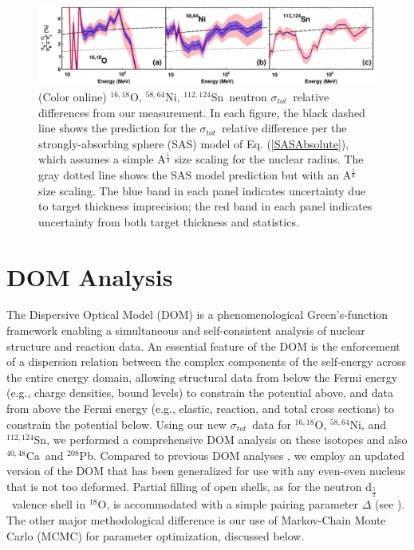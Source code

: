 \documentclass[twocolumn,secnumarabic,amssymb, nobibnotes, aps, prl,
superscriptaddress, nobalancelastpage]{revtex4}
\newcommand{\tot}{\ensuremath{\sigma_{tot}}}
\newcommand{\oEight}{\ensuremath{^{18}}O}
\newcommand{\oSixEight}{\ensuremath{^{16,18}}O}
\newcommand{\caAughtEight}{\ensuremath{^{40,48}}C\lowercase{a}}
\newcommand{\niEightFour}{\ensuremath{^{58,64}}N\lowercase{i}}
\newcommand{\snTwelveFour}{\ensuremath{^{112,124}}S\lowercase{n}}
\newcommand{\pbEight}{\ensuremath{^{208}}P\lowercase{b}}
\newcommand{\dFive}{d\ensuremath{_{\frac{5}{2}}}}
\begin{document}
\begin{figure}[tb]
    \centering
    \includegraphics[width=\textwidth]{figures/ThreePanelRelDiff.png}
    \caption[\oSixEight, \niEightFour, \snTwelveFour\ neutron \tot\ relative difference]
    {
        (Color online) \oSixEight, \niEightFour, \snTwelveFour\ neutron \tot\ relative differences
        from our measurement. In each figure, the black dashed line shows the 
        prediction for the \tot\ relative difference per the strongly-absorbing 
        sphere (SAS) model of Eq. (\ref{SASAbsolute}), which assumes a simple 
        A$^{\frac{1}{3}}$ size scaling for the nuclear radius.
        The gray dotted line shows the
        SAS model prediction but with an
        A$^{\frac{1}{6}}$ size scaling. The blue band in each panel indicates
        uncertainty due to target thickness imprecision;
        the red band in each panel
        indicates uncertainty from both target thickness and statistics.
    }
    \label{ThreePanelRelDiff}
\end{figure}

\section{DOM Analysis}
The Dispersive Optical Model (DOM) is a phenomenological Green's-function
framework enabling a simultaneous and self-consistent analysis of nuclear
structure and reaction data. An essential feature of the DOM is the enforcement of a dispersion
relation between the complex components of the self-energy across the entire
energy domain, allowing structural data from below the Fermi energy
(e.g., charge densities, bound levels) to constrain the potential above,
and data from above the Fermi energy (e.g., elastic, reaction, and total
cross sections) to constrain the potential
below. Using our new \tot\ data for \oSixEight, \niEightFour, and \snTwelveFour, we
performed a comprehensive DOM analysis on these isotopes and also
\caAughtEight\ and \pbEight. Compared to previous DOM
analyses \cite{Mueller2011, Atkinson2017, Mahzoon2014, Mahzoon2017},
we employ an updated version of the DOM that has been generalized for use with
any even-even nucleus that is not too deformed. Partial filling of open shells,
as for the neutron \dFive\ valence shell in \oEight, is accommodated with a simple
pairing parameter $\Delta$ (see \cite{PruittPhDThesis}). The other major
methodological difference is our use of Markov-Chain Monte Carlo (MCMC) for
parameter optimization, discussed below. 
\end{document}
